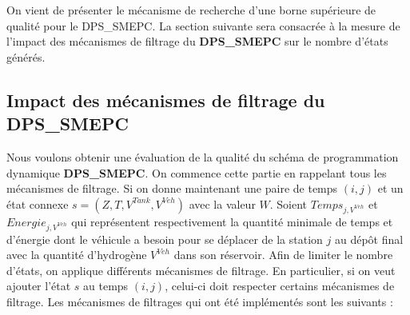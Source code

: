 On vient de présenter le mécanisme de recherche d'une borne supérieure de qualité pour le DPS\_SMEPC. La section suivante sera consacrée à la mesure de l'impact des mécanismes de filtrage du \textbf{DPS\_SMEPC} sur le nombre d'états générés.

\subsection{Impact des mécanismes de filtrage du DPS\_SMEPC}
\label{TempsEnergie}
 Nous voulons obtenir une évaluation de la qualité du schéma de programmation dynamique \textbf{DPS\_SMEPC}. On commence cette partie en rappelant tous les mécanismes de filtrage.
Si on donne maintenant une paire de temps $(i, j)$ et un état connexe $s = (Z, T, V^{Tank}, V^{Veh})$ avec la valeur $W$. Soient $Temps_{j,V^{Veh}}$ et $Energie_{j,V^{Veh}}$ qui représentent respectivement la quantité minimale de temps et d'énergie dont le véhicule  a besoin pour se déplacer de la station $j$ au dépôt final avec la quantité d'hydrogène $V^{Veh}$ dans son réservoir. Afin de limiter le nombre d'états, on applique différents mécanismes de filtrage. En particulier, si on veut ajouter l'état $s$ au temps $(i,j)$, celui-ci doit respecter certains mécanismes de filtrage. Les mécanismes de filtrages qui ont été implémentés sont les suivants :
